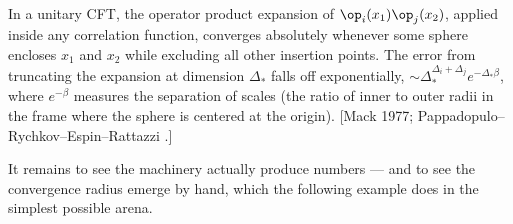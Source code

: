 \begin{ttheorem}
\label{thm:ope-convergence}
In a unitary CFT, the operator product expansion of $\op_i(x_1)\op_j(x_2)$,
applied inside any correlation function, converges absolutely whenever some
sphere encloses $x_1$ and $x_2$ while excluding all other insertion points.
The error from truncating the expansion at dimension $\Delta_*$ falls off
exponentially, $\sim \Delta_*^{\Delta_i+\Delta_j}e^{-\Delta_* \beta}$,
where $e^{-\beta}$ measures the separation of scales (the ratio of inner to
outer radii in the frame where the sphere is centered at the origin). [Mack
1977; Pappadopulo--Rychkov--Espin--Rattazzi .]
\end{ttheorem}

\noin It remains to see the machinery actually produce numbers --- and to see
the convergence radius emerge by hand, which the following example does in the
simplest possible arena.

